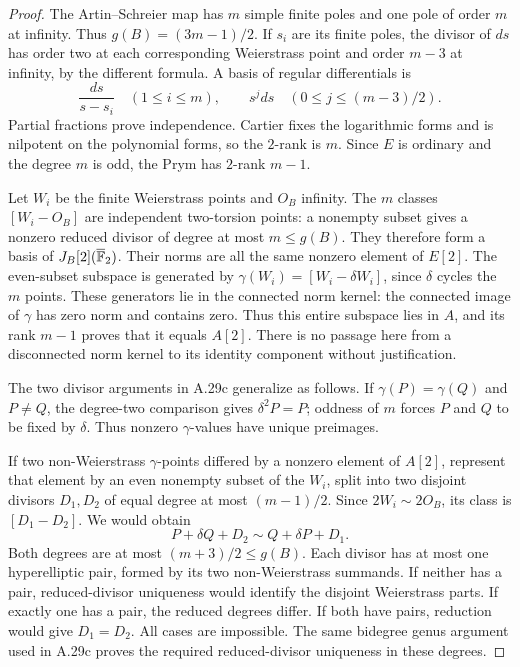 \begin{proof}
The Artin--Schreier map has $m$ simple finite poles and
one pole of order $m$ at infinity. Thus
$g(B)=(3m-1)/2$. If $s_i$ are its finite poles, the
divisor of $ds$ has order two at each corresponding
Weierstrass point and order $m-3$ at infinity, by the
different formula. A basis of regular differentials is
\[
 \frac{ds}{s-s_i}\quad(1\le i\le m),
 \qquad s^jds\quad(0\le j\le(m-3)/2).
\]
Partial fractions prove independence. Cartier fixes
the logarithmic forms and is nilpotent on the polynomial
forms, so the $2$-rank is $m$. Since $E$ is ordinary
and the degree $m$ is odd, the Prym has $2$-rank $m-1$.

Let $W_i$ be the finite Weierstrass points and $O_B$
infinity. The $m$ classes $[W_i-O_B]$ are independent
two-torsion points: a nonempty subset gives a nonzero
reduced divisor of degree at most $m\le g(B)$. They
therefore form a basis of $J_B[2](\overline{\mathbb F}_2)$.
Their norms are all the same nonzero element of $E[2]$.
The even-subset subspace is generated by
$\gamma(W_i)=[W_i-\delta W_i]$, since $\delta$ cycles
the $m$ points. These generators lie in the connected
norm kernel: the connected image of $\gamma$ has zero
norm and contains zero. Thus this entire subspace lies
in $A$, and its rank $m-1$ proves that it equals $A[2]$.
There is no passage here from a disconnected norm
kernel to its identity component without justification.

The two divisor arguments in A.29c generalize as follows.
If $\gamma(P)=\gamma(Q)$ and $P\ne Q$, the degree-two
comparison gives $\delta^2P=P$; oddness of $m$ forces
$P$ and $Q$ to be fixed by $\delta$. Thus nonzero
$\gamma$-values have unique preimages.

If two non-Weierstrass $\gamma$-points differed by a
nonzero element of $A[2]$, represent that element by
an even nonempty subset of the $W_i$, split into two
disjoint divisors $D_1,D_2$ of equal degree at most
$(m-1)/2$. Since $2W_i\sim2O_B$, its class is
$[D_1-D_2]$. We would obtain
\[
 P+\delta Q+D_2\sim Q+\delta P+D_1.                    \tag{A.36}
\]
Both degrees are at most $(m+3)/2\le g(B)$. Each
divisor has at most one hyperelliptic pair, formed by
its two non-Weierstrass summands. If neither has a
pair, reduced-divisor uniqueness would identify the
disjoint Weierstrass parts. If exactly one has a pair,
the reduced degrees differ. If both have pairs,
reduction would give $D_1=D_2$. All cases are impossible.
The same bidegree genus argument used in A.29c proves
the required reduced-divisor uniqueness in these degrees.


\end{proof}
